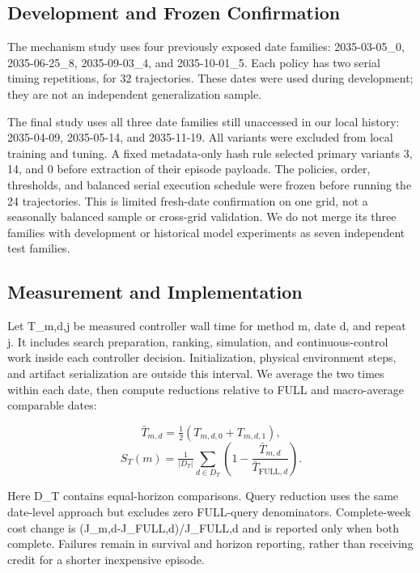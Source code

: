 \subsection{Development and Frozen Confirmation}

The mechanism study uses four previously exposed date families: 2035-03-05\_0, 2035-06-25\_8, 2035-09-03\_4, and 2035-10-01\_5. Each policy has two serial timing repetitions, for 32 trajectories. These dates were used during development; they are not an independent generalization sample.


The final study uses all three date families still unaccessed in our local history: 2035-04-09, 2035-05-14, and 2035-11-19. All variants were excluded from local training and tuning. A fixed metadata-only hash rule selected primary variants 3, 14, and 0 before extraction of their episode payloads. The policies, order, thresholds, and balanced serial execution schedule were frozen before running the 24 trajectories. This is limited fresh-date confirmation on one grid, not a seasonally balanced sample or cross-grid validation. We do not merge its three families with development or historical model experiments as seven independent test families.


\subsection{Measurement and Implementation}

Let T\_m,d,j be measured controller wall time for method m, date d, and repeat j. It includes search preparation, ranking, simulation, and continuous-control work inside each controller decision. Initialization, physical environment steps, and artifact serialization are outside this interval. We average the two times within each date, then compute reductions relative to FULL and macro-average comparable dates:


\begin{equation}
\bar T_{m,d}=\tfrac12(T_{m,d,0}+T_{m,d,1}),
\end{equation}
\begin{equation}
S_T(m)=\tfrac1{|D_T|}\sum_{d\in D_T}\left(1-\frac{\bar T_{m,d}}{\bar T_{\mathrm{FULL},d}}\right).
\end{equation}

Here D\_T contains equal-horizon comparisons. Query reduction uses the same date-level approach but excludes zero FULL-query denominators. Complete-week cost change is (J\_m,d-J\_FULL,d)/J\_FULL,d and is reported only when both complete. Failures remain in survival and horizon reporting, rather than receiving credit for a shorter inexpensive episode.


